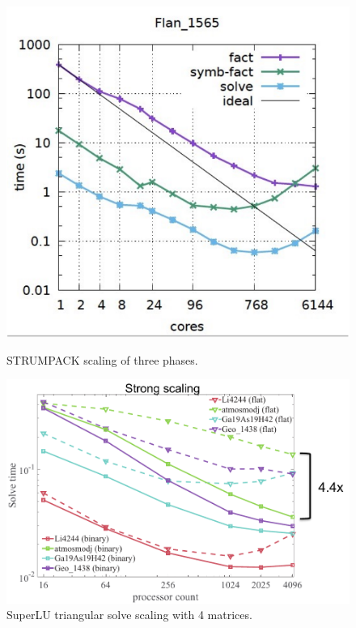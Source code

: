 \vspace{-.3in}
\begin{figure}[htb]
\begin{minipage}[b]{0.48\columnwidth}
\centering
\includegraphics[scale=0.45]{projects/2.3.3-MathLibs/2.3.3.07-STRUMPACK-SuperLU/strumpack-scaling.pdf}
\caption{STRUMPACK scaling of three phases.}
\label{fig:strumpack-scaling}
\end{minipage}
\begin{minipage}[b]{0.48\columnwidth}
\centering
\includegraphics[scale=0.45]{projects/2.3.3-MathLibs/2.3.3.07-STRUMPACK-SuperLU/superlu-trisolve-scaling}
\caption{SuperLU triangular solve scaling with 4 matrices.}
\label{fig:superlu-trisolve}
\end{minipage}
\end{figure}


